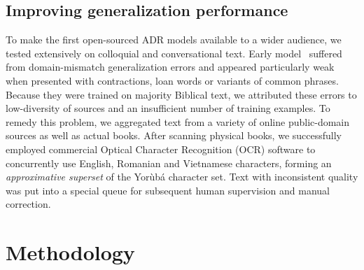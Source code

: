 \documentclass{article} %
\begin{document}

\subsection{Improving generalization performance}

To make the first open-sourced ADR models available to a wider audience, we tested extensively on colloquial and conversational text. Early model~\citep{orife2018adr} suffered from domain-mismatch generalization errors and appeared particularly weak when presented with contractions, loan words or variants of common phrases. Because they were trained on majority Biblical text, we attributed these errors to low-diversity of sources and an insufficient number of training examples. To remedy this problem, we aggregated text from a variety of online public-domain sources as well as actual books. After scanning physical books, we successfully employed commercial Optical Character Recognition (OCR) software to concurrently use English, Romanian and Vietnamese characters, forming an \emph{approximative superset} of the Yor{\`u}b{\'a} character set. Text with inconsistent quality was put into a special queue for subsequent human supervision and manual correction. 

\section{Methodology}\label{sec:methods}


\end{document}
